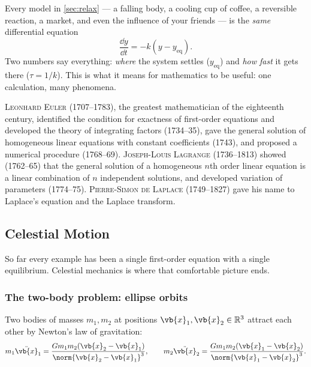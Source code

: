 \begin{moral}
	Every model in \autoref{sec:relax} --- a falling body, a cooling cup of coffee, a
	reversible reaction, a market, and even the influence of your friends --- is the
	\emph{same} differential equation
	\[
		\frac{\dd y}{\dd t} = -k\left( y - y_{\mathrm{eq}} \right).
	\]
	Two numbers say everything: \emph{where} the system settles (\(y_{\mathrm{eq}}\)) and
	\emph{how fast} it gets there (\(\tau = 1/k\)). This is what it means for mathematics
	to be useful: one calculation, many phenomena.
\end{moral}

\begin{note}
	\textsc{Leonhard Euler} (1707--1783), the greatest mathematician of the eighteenth
	century, identified the condition for exactness of first-order equations and developed
	the theory of integrating factors (1734--35), gave the general solution of homogeneous
	linear equations with constant coefficients (1743), and proposed a numerical procedure
	(1768--69). \textsc{Joseph-Louis Lagrange} (1736--1813) showed (1762--65) that the
	general solution of a homogeneous \(n\)th order linear equation is a linear
	combination of \(n\) independent solutions, and developed variation of parameters
	(1774--75). \textsc{Pierre-Simon de Laplace} (1749--1827) gave his name to Laplace's
	equation and the Laplace transform.
\end{note}

\subsection{Celestial Motion}


So far every example has been a single first-order equation with a single equilibrium.
Celestial mechanics is where that comfortable picture ends.

\subsubsection*{The two-body problem: ellipse orbits}

\begin{eg}
	Two bodies of masses \(m_1, m_2\) at positions
	\(\vb{x}_1, \vb{x}_2 \in \mathbb{R}^3\) attract each other by Newton's law of
	gravitation:
	\begin{equation}\label{eq:twobody}
		m_1 \ddot{\vb{x}}_1 = \frac{G m_1 m_2 (\vb{x}_2 - \vb{x}_1)}
		{\norm{\vb{x}_2 - \vb{x}_1}^3},
		\qquad
		m_2 \ddot{\vb{x}}_2 = \frac{G m_1 m_2 (\vb{x}_1 - \vb{x}_2)}
		{\norm{\vb{x}_1 - \vb{x}_2}^3}.
	\end{equation}
\end{eg}

